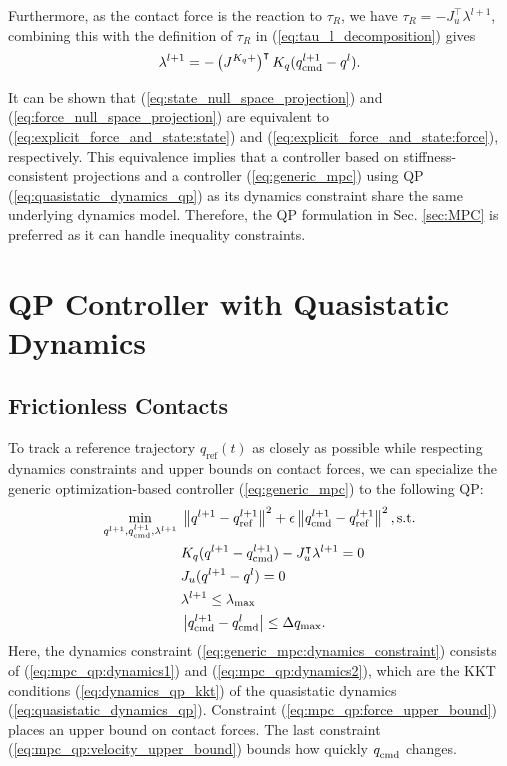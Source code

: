Furthermore, as the contact force is the reaction to $\tau_R$, we have $\tau_R = -J_u^\intercal \lambda^{l+1}$, combining this with the definition of $\tau_R$ in (\ref{eq:tau_l_decomposition}) gives
\begin{equation}
\label{eq:force_null_space_projection}
\lambda^{l+1} = -\left(J^{K_q+} \right)^\intercal K_q(\qcmd[l+1] - q^l).
\end{equation}

It can be shown that (\ref{eq:state_null_space_projection}) and (\ref{eq:force_null_space_projection}) are equivalent to (\ref{eq:explicit_force_and_state:state}) and (\ref{eq:explicit_force_and_state:force}), respectively. This equivalence implies that a controller based on stiffness-consistent projections and a controller (\ref{eq:generic_mpc}) using QP (\ref{eq:quasistatic_dynamics_qp}) as its dynamics constraint share the same underlying dynamics model. Therefore, the QP formulation in Sec. \ref{sec:MPC} is preferred as it can handle inequality constraints.


\section{QP Controller with Quasistatic Dynamics \label{sec:MPC}}
\subsection{Frictionless Contacts}
To track a reference trajectory $q_\text{ref}(t)$ as closely as possible while respecting dynamics constraints and upper bounds on contact forces, we can specialize the generic optimization-based controller (\ref{eq:generic_mpc}) to the following QP:
\begin{subequations}
\label{eq:mpc_qp1}
\begin{align}
\underset{q^{l+1}, q_{\text{cmd}}^{l+1}, \lambda^{l+1}} {\rm min} \; &\left\|q^{l+1} - q_\text{ref}^{l+1}\right\|^2 + 
\epsilon \left\|q_{\rm cmd}^{l+1} - q_\text{ref}^{l+1}\right\|^2 , \text{s.t.} \label{eq:mpc_qp1:objective} \\
&K_q(q^{l+1} - q_\text{cmd}^{l+1}) - J_u^\intercal \lambda^{l+1} = 0 \label{eq:mpc_qp:dynamics1}\\
&J_u(q^{l+1} - q^l) = 0 \label{eq:mpc_qp:dynamics2}\\
&\lambda^{l+1} \leq \lambda_\text{max} \label{eq:mpc_qp:force_upper_bound}\\
&\left|q_\text{cmd}^{l+1} - \qcmd[l]\right| \leq \Delta q_\text{max}. \label{eq:mpc_qp:velocity_upper_bound}
\end{align}
\end{subequations}
Here, the dynamics constraint (\ref{eq:generic_mpc:dynamics_constraint}) consists of (\ref{eq:mpc_qp:dynamics1}) and (\ref{eq:mpc_qp:dynamics2}), which are the KKT conditions (\ref{eq:dynamics_qp_kkt}) of the quasistatic dynamics (\ref{eq:quasistatic_dynamics_qp}). Constraint (\ref{eq:mpc_qp:force_upper_bound}) places an upper bound on contact forces. The last constraint (\ref{eq:mpc_qp:velocity_upper_bound}) bounds how quickly $\qcmd$ changes.

